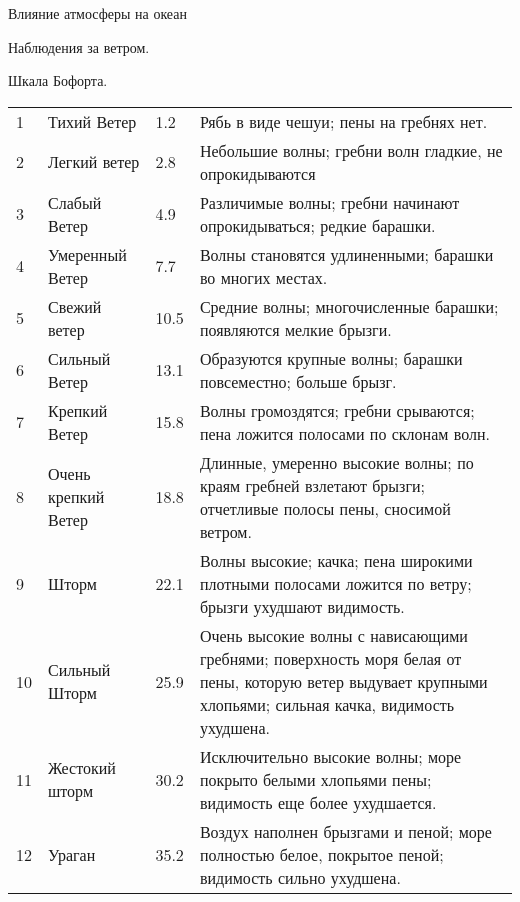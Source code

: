 \begin{chapter}{Влияние атмосферы на океан}
\begin{section}{Наблюдения за ветром.}
\begin{paragraph}{Шкала Бофорта.}
\begin{tabular}{llll}
1 & Тихий Ветер & 1.2 &
Рябь в виде чешуи; пены на гребнях нет. \\

2 & Легкий ветер & 2.8 &
Небольшие волны; гребни волн гладкие, не опрокидываются \\

3 & Слабый Ветер & 4.9 & 
Различимые волны; гребни начинают опрокидываться; редкие барашки. \\

4 & Умеренный Ветер & 7.7 &
Волны становятся удлиненными; барашки во многих местах. \\

5 & Свежий ветер & 10.5 &
Средние волны; многочисленные барашки; появляются мелкие брызги. \\

6 & Сильный Ветер & 13.1 & 
Образуются крупные волны; барашки повсеместно; больше брызг. \\

7 & Крепкий Ветер & 15.8 & 
Волны громоздятся; гребни срываются; пена ложится полосами по склонам
волн. \\

8 & Очень крепкий Ветер & 18.8 &
Длинные, умеренно высокие волны; по краям гребней взлетают брызги;
отчетливые полосы пены, сносимой ветром. \\

9 & Шторм & 22.1 & 
Волны высокие; качка; пена широкими плотными полосами ложится по
ветру; брызги ухудшают видимость. \\

10 & Сильный Шторм & 25.9 & 
Очень высокие волны с нависающими гребнями; поверхность моря белая от
пены, которую ветер выдувает крупными хлопьями; сильная качка,
видимость ухудшена. \\

11 & Жестокий шторм & 30.2 & 
Исключительно высокие волны; море покрыто белыми хлопьями пены;
видимость еще более ухудшается. \\

12 & Ураган & 35.2 &
Воздух наполнен брызгами и пеной; море полностью белое, покрытое
пеной; видимость сильно ухудшена. \\
\end{tabular}


\end{paragraph}
\end{section}
\end{chapter}
